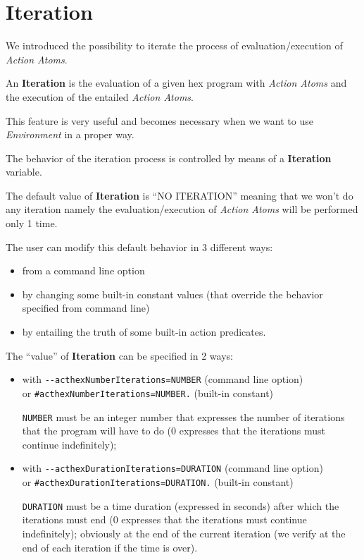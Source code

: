 \documentclass[a4paper, 11pt]{article}
\newcommand{\Iteration}{\textbf{Iteration}\xspace}
\begin{document}
	\section*{Iteration}
		We introduced the possibility to iterate the process of evaluation/execution of \textit{Action Atoms}.

		An \Iteration is the evaluation of a given hex program with \textit{Action Atoms} and the execution of the entailed \textit{Action Atoms}.

		This feature is very useful and becomes necessary when we want to use \textit{Environment} in a proper way.

		\vspace*{1em}

		The behavior of the iteration process is controlled by means of a \Iteration variable.

		The default value of \Iteration is ``NO ITERATION'' meaning that we won't do any iteration namely the evaluation/execution of \textit{Action Atoms} will be performed only 1 time.

		\vspace*{1em}

		The user can modify this default behavior in 3 different ways:
		\begin{itemize}
			\item from a command line option
			\item by changing some built-in constant values (that override the behavior specified from command line)
			\item by entailing the truth of some built-in action predicates.
		\end{itemize}

		\vspace*{1em}

		The ``value'' of \Iteration can be specified in 2 ways:
		\begin{itemize}
			\item with \verb|--acthexNumberIterations=NUMBER| (command line option)\\
					or \verb|#acthexNumberIterations=NUMBER.| (built-in constant)

				\verb|NUMBER| must be an integer number that expresses the number of iterations that the program will have to do (0 expresses that the iterations must continue indefinitely);

			\item with \verb|--acthexDurationIterations=DURATION| (command line option)\\
					or \verb|#acthexDurationIterations=DURATION.| (built-in constant)

				\verb|DURATION| must be a time duration (expressed in seconds) after which the iterations must end (0 expresses that the iterations must continue indefinitely); obviously at the end of the current iteration (we verify at the end of each iteration if the time is over).
		\end{itemize}
\end{document}
